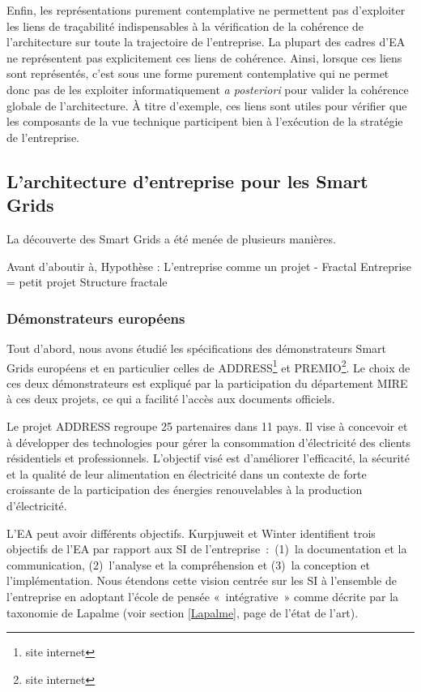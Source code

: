 	Enfin, les représentations purement contemplative ne permettent pas d'exploiter 
les liens de traçabilité 
indispensables à la vérification de la cohérence de l'architecture sur 
toute la trajectoire de l'entreprise. La plupart des cadres d'EA ne représentent 
pas 
explicitement ces liens de cohérence. Ainsi, lorsque ces liens sont 
représentés, c'est sous une forme purement contemplative qui ne permet donc pas 
de les exploiter informatiquement \textit{a posteriori} pour valider la 
cohérence globale de l'architecture.   À titre d'exemple, ces liens sont utiles 
pour vérifier que les composants de la vue technique participent bien à 
l'exécution de la stratégie de l'entreprise. 
	
	\subsection{L'architecture d'entreprise pour les Smart Grids}
	
La découverte des Smart Grids a été menée de plusieurs manières.

Avant d'aboutir à, Hypothèse : L'entreprise comme un projet - Fractal
Entreprise = petit projet
Structure fractale
 
\subsubsection{Démonstrateurs européens}
\label{sec:DemonstrateursSG}

Tout d'abord, nous avons étudié les spécifications des démonstrateurs Smart 
Grids européens et en particulier celles de ADDRESS\footnote{site internet} et 
PREMIO\footnote{site internet}. Le choix de ces deux démonstrateurs est expliqué 
par la participation du département MIRE à ces deux projets, ce qui a facilité 
l'accès aux documents officiels. 

Le projet ADDRESS regroupe 25 partenaires dans 11 pays. Il vise à concevoir et à 
développer des technologies pour gérer la consommation d'électricité des clients 
résidentiels et professionnels. L'objectif visé est d'améliorer l'efficacité, la 
sécurité et la qualité de leur alimentation en électricité dans un contexte de 
forte croissante de la participation des énergies renouvelables à la production 
d'électricité. 

L'EA peut avoir différents objectifs. Kurpjuweit et Winter \cite{kurpjuweit2007viewpoint} identifient trois objectifs de l'EA par rapport aux SI de l'entreprise~:~(1)~la documentation et la communication, (2)~l'analyse et la compréhension et (3)~la conception et l'implémentation. Nous étendons cette vision centrée sur les SI à l'ensemble de l'entreprise en adoptant l'école de pensée «~intégrative~» comme décrite par la taxonomie de Lapalme (voir section \ref{Lapalme}, page \pageref{Lapalme} de l'état de l'art). 

